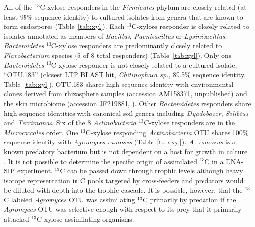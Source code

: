 All of the $^{13}$C-xylose responders in the \textit{Firmicutes} phylum are
closely related (at least 99\% sequence identity) to cultured isolates from
genera that are known to form endospores (Table~\ref{tab:xyl}). Each
$^{13}$C-xylose responder is closely related to isolates annotated as members
of \textit{Bacillus}, \textit{Paenibacillus} or \textit{Lysinibacillus}.
\textit{Bacteroidetes} $^{13}$C-xylose responders are predominantly closely
related to \textit{Flavobacterium} species (5 of 8 total responders)
(Table~\ref{tab:xyl}).  Only one \textit{Bacteroidetes} $^{13}$C-xylose
responder is not closely related to a cultured isolate, ``OTU.183'' (closest
LTP BLAST hit, \textit{Chitinophaca sp.}, 89.5\% sequence identity,
Table~\ref{tab:xyl}). OTU.183 shares high sequence identity with environmental
clones derived from rhizosphere samples (accession AM158371, unpublished) and
the skin microbiome (accession JF219881, \citet{Kong_2012}). Other
\textit{Bacteroidetes} responders share high sequence identities with canonical
soil genera including \textit{Dyadobacer}, \textit{Solibius} and
\textit{Terrimonas}. Six of the 8 \textit{Actinobacteria} $^{13}$C-xylose
responders are in the \textit{Micrococcales} order. One $^{13}$C-xylose
responding \textit{Actinobacteria} OTU shares 100\% sequence identity with
\textit{Agromyces ramosus} (Table~\ref{tab:xyl}).  \textit{A. ramosus} is a
known predatory bacterium but is not dependent on a host for growth in culture
\citep{16346402}. It is not possible to determine the specific origin of
assimilated $^{13}$C in a DNA-SIP experiment. $^{13}$C can be passed down
through trophic levels although heavy isotope representation in C pools
targeted by cross-feeders and predators would be diluted with depth into the
trophic cascade. It is possible, however, that the $^{13}$C labeled
\textit{Agromyces} OTU was assimilating $^{13}$C primarily by predation if the
\textit{Agromyces} OTU was selective enough with respect to its prey that it
primarily attacked $^{13}$C-xylose assimilating organisms. 

